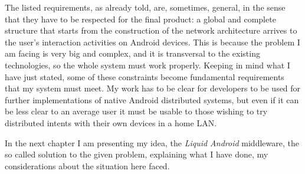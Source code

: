 The listed requirements, as already told, are, sometimes, general, in the sense that they have to be respected for the final product: a global and complete structure that starts from the construction of the network architecture arrives to the user's interaction activities on Android devices. This is because the problem I am facing is very big and complex, and it is transversal to the existing technologies, so the whole system must work properly. Keeping in mind what I have just stated, some of these constraints become fundamental requirements that my system must meet. My work has to be clear for developers to be used for further implementations of native Android distributed systems, but even if it can be less clear to an average user it must be usable to those wishing to try distributed intents with their own devices in a home LAN.

\bigskip
\bigskip
\bigskip
\bigskip
\bigskip
\bigskip
\par
In the next chapter I am presenting my idea, the \textit{Liquid Android} middleware, the so called solution to the given problem, explaining what I have done, my considerations about the situation here faced.

%
